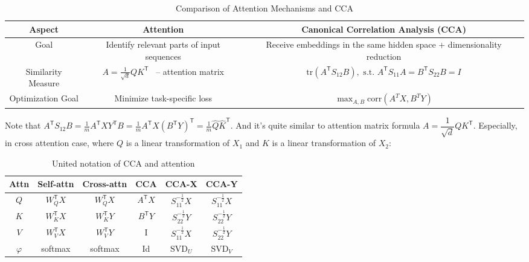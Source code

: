 \documentclass[a4paper,14pt]{article}
\newcommand{\T}{^{\mathsf{T}}}
\theoremstyle{plain} %
\theoremstyle{definition} %
\theoremstyle{remark} %
\begin{document}
	\begin{table}[bhtp]
		\centering
		\begin{tabulary}{\textwidth}{|C|C|C|}
			\hline
			\textbf{Aspect} & \textbf{Attention} & \textbf{Canonical Correlation Analysis (CCA)} \\ 
			\hline
			Goal & Identify relevant parts of input sequences & Receive embeddings in the same hidden space + dimensionality reduction \\
			\hline
			Similarity Measure & $A = \frac{1}{\sqrt{d}} Q K\T$ ~-- attention matrix & $\text{tr}(A\T S_{12} B), \text{ s.t. } A\T S_{11} A = B\T S_{22} B = I$ \\
			\hline
			Optimization Goal & Minimize task-specific loss & $\max_{A,B} \text{corr}(A^T X, B^T Y)$ \\
			\hline
		\end{tabulary}
		\caption{Comparison of Attention Mechanisms and CCA}
	\end{table}
	
	Note that $A\T S_{12} B = \frac{1}{m} A\T X Y\T B = \frac{1}{m} A\T X \left( B\T Y \right)\T = \frac{1}{m} \widehat{Q} \widehat{K}\T $. And it's quite similar to attention matrix formula $A = \dfrac{1}{\sqrt{d}} Q K\T$. Especially, in cross attention case, where $Q$ is a linear transformation of $X_1$ and $K$ is a linear transformation of $X_2$:
	
	\begin{table}[bhtp]
		\centering
		\begin{tabulary}{\textwidth}{|C|C|C|C|C|C|}
			\hline
			\textbf{Attn} & \textbf{Self-attn} & \textbf{Cross-attn} & \textbf{CCA} & \textbf{CCA-X} & \textbf{CCA-Y} \\
			\hline
			$Q$                & $W_Q\T X$                 & $W_Q\T X$                  & $A\T X$ & $S_{11}^{-\frac{1}{2}}X$ & $S_{11}^{-\frac{1}{2}}X$  \\
			\hline
			$K$                & $W_K\T X$                 & $W_K\T Y$                  & $B\T Y$ & $S_{22}^{-\frac{1}{2}}Y$ & $S_{22}^{-\frac{1}{2}}Y$    \\
			\hline
			$V$                & $W_V\T X$                 & $W_V\T Y$                  & I & $S_{11}^{-\frac{1}{2}}X$ & $S_{22}^{-\frac{1}{2}}Y$  \\
			\hline 
			$\varphi$ & softmax & softmax & Id & $\text{SVD}_U$ & $\text{SVD}_V$ \\
			\hline  
		\end{tabulary}
		\caption{United notation of CCA and attention}
	\end{table}
\end{document}
